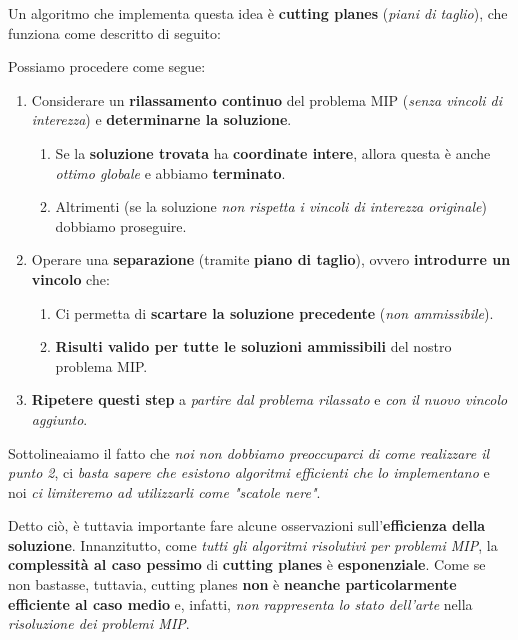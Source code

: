 Un algoritmo che implementa questa idea è \textbf{cutting planes}
(\textit{piani di taglio}), che funziona come descritto di seguito:

\begin{definition}
    Possiamo procedere come segue:
    \begin{enumerate}
        \item Considerare un \textbf{rilassamento continuo} del problema MIP 
            (\textit{senza vincoli di interezza}) e \textbf{determinarne la soluzione}.
            \begin{enumerate}
            \item Se la \textbf{soluzione trovata} ha \textbf{coordinate intere}, 
                allora questa è anche \textit{ottimo globale} e abbiamo \textbf{terminato}.
            \item Altrimenti (se la soluzione \textit{non rispetta i vincoli di interezza originale}) 
                dobbiamo proseguire.
            \end{enumerate}
        \item Operare una \textbf{separazione} (tramite \textbf{piano di taglio}), ovvero 
            \textbf{introdurre un vincolo} che:
            \begin{enumerate}
                \item Ci permetta di \textbf{scartare la soluzione precedente} (\textit{non ammissibile}).
                \item \textbf{Risulti valido per tutte le soluzioni ammissibili} del nostro 
                    problema MIP.
            \end{enumerate}
    \item \textbf{Ripetere questi step} a \textit{partire dal problema rilassato} e 
        \textit{con il nuovo vincolo aggiunto}.
    \end{enumerate}
\end{definition}

Sottolineaiamo il fatto che \textit{noi non dobbiamo preoccuparci di come realizzare il punto 2},
ci \textit{basta sapere che esistono algoritmi efficienti che lo implementano} e noi 
\textit{ci limiteremo ad utilizzarli come "scatole nere"}.

Detto ciò, è tuttavia importante fare alcune osservazioni sull'\textbf{efficienza della soluzione}.
Innanzitutto, come \textit{tutti gli algoritmi risolutivi per problemi MIP}, la
\textbf{complessità al caso pessimo} di \textbf{cutting planes} è \textbf{esponenziale}.
Come se non bastasse, tuttavia, cutting planes \textbf{non} è 
\textbf{neanche particolarmente efficiente al caso medio} e, infatti, 
\textit{non rappresenta lo stato dell'arte} nella \textit{risoluzione dei problemi MIP}.

